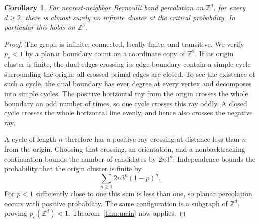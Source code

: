 \documentclass[11pt]{article}
\newtheorem{corollary}[theorem]{Corollary}
\theoremstyle{definition}
\begin{document}
\begin{corollary}
\label{cor:lattices}
For nearest-neighbor Bernoulli bond percolation on $\mathbb Z^d$, for every
$d\ge2$, there is almost surely no infinite cluster at the critical
probability. In particular this holds on $\mathbb Z^3$.
\end{corollary}

\begin{proof}
The graph is infinite, connected, locally finite, and transitive.
We verify $p_c<1$ by a planar boundary count on a coordinate copy
of $\mathbb Z^2$. If its origin cluster is finite, the dual edges crossing
its edge boundary contain a simple cycle surrounding the origin;
all crossed primal edges are closed. To see the existence of such
a cycle, the dual boundary has even degree at every vertex and
decomposes into simple cycles. The positive horizontal ray from
the origin crosses the whole boundary an odd number of times, so
one cycle crosses this ray oddly. A closed cycle crosses the whole
horizontal line evenly, and hence also crosses the negative ray.

A cycle of length $n$ therefore has a positive-ray crossing at
distance less than $n$ from the origin. Choosing that crossing,
an orientation, and a nonbacktracking continuation bounds the
number of candidates by $2n3^n$. Independence bounds the probability
that the origin cluster is finite by
\[
 \sum_{n\ge1}2n3^n(1-p)^n.
\]
For $p<1$ sufficiently close to one this sum is less than one,
so planar percolation occurs with positive probability. The same
configuration is a subgraph of $\mathbb Z^d$, proving $p_c(\mathbb Z^d)<1$.
Theorem~\ref{thm:main} now applies.
\end{proof}



\end{document}
